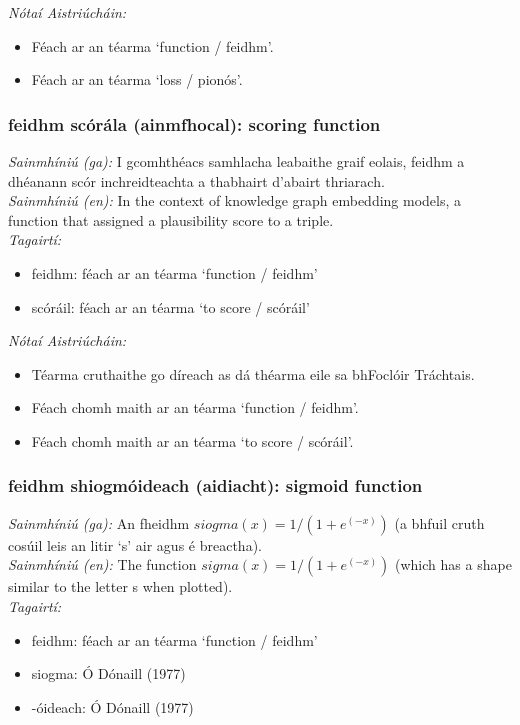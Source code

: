  \noindent \textit{Nótaí Aistriúcháin:}
\begin{itemize}
	\item Féach ar an téarma `function / feidhm'.
	\item Féach ar an téarma `loss / pionós'.
\end{itemize}


\subsubsection*{feidhm scórála (ainmfhocal): scoring function}
 \noindent \textit{Sainmhíniú (ga):} I gcomhthéacs samhlacha leabaithe graif eolais, feidhm a dhéanann scór inchreidteachta a thabhairt d'abairt thriarach.
\\
 \noindent \textit{Sainmhíniú (en):} In the context of knowledge graph embedding models, a function that assigned a plausibility score to a triple.
\\
 \noindent \textit{Tagairtí:}
\begin{itemize}
	\item feidhm: féach ar an téarma `function / feidhm'
	\item scóráil: féach ar an téarma `to score / scóráil'
\end{itemize}

 \noindent \textit{Nótaí Aistriúcháin:}
\begin{itemize}
	\item Téarma cruthaithe go díreach as dá théarma eile sa bhFoclóir Tráchtais.
	\item Féach chomh maith ar an téarma `function / feidhm'.
	\item Féach chomh maith ar an téarma `to score / scóráil'.
\end{itemize}


\subsubsection*{feidhm shiogmóideach (aidiacht): sigmoid function}
 \noindent \textit{Sainmhíniú (ga):} An fheidhm $siogma(x) = 1 / (1 + e^(-x))$ (a bhfuil cruth cosúil leis an litir `s' air agus é breactha).
\\
 \noindent \textit{Sainmhíniú (en):} The function $sigma(x) = 1 / (1 + e^(-x))$ (which has a shape similar to the letter s when plotted).
\\
 \noindent \textit{Tagairtí:}
\begin{itemize}
	\item feidhm: féach ar an téarma `function / feidhm'
	\item siogma: Ó Dónaill (1977) \cite{odonaill}
	\item -óideach: Ó Dónaill (1977) \cite{odonaill}
\end{itemize}

